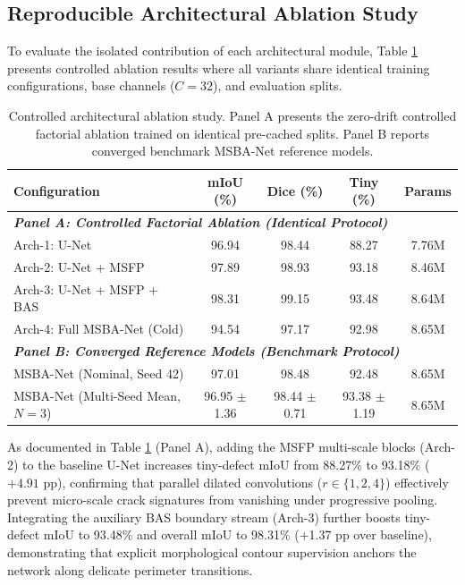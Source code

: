 \documentclass{ieeeaccess}
\begin{document}
\subsection{Reproducible Architectural Ablation Study}
To evaluate the isolated contribution of each architectural module, Table \ref{tab:ablation} presents controlled ablation results where all variants share identical training configurations, base channels ($C=32$), and evaluation splits.

\begin{table}[!t]
\centering
\setlength{\tabcolsep}{1.8pt}
\fontsize{6.8pt}{8.8pt}\selectfont
\caption{Controlled architectural ablation study. Panel A presents the zero-drift controlled factorial ablation trained on identical pre-cached splits. Panel B reports converged benchmark MSBA-Net reference models.}
\label{tab:ablation}
\begin{tabular*}{\columnwidth}{@{\extracolsep{\fill}}lcccc@{}}
\toprule
\textbf{Configuration} & \textbf{mIoU (\%)} & \textbf{Dice (\%)} & \textbf{Tiny (\%)} & \textbf{Params} \\
\midrule
\multicolumn{5}{l}{\textit{\textbf{Panel A: Controlled Factorial Ablation (Identical Protocol)}}} \\
Arch-1: U-Net \cite{ronneberger2015unet} & 96.94 & 98.44 & 88.27 & 7.76M \\
Arch-2: U-Net + MSFP & 97.89 & 98.93 & 93.18 & 8.46M \\
Arch-3: U-Net + MSFP + BAS & 98.31 & 99.15 & 93.48 & 8.64M \\
Arch-4: Full MSBA-Net (Cold) & 94.54 & 97.17 & 92.98 & 8.65M \\
\midrule
\multicolumn{5}{l}{\textit{\textbf{Panel B: Converged Reference Models (Benchmark Protocol)}}} \\
MSBA-Net (Nominal, Seed 42) & 97.01 & 98.48 & 92.48 & 8.65M \\
MSBA-Net (Multi-Seed Mean, $N=3$) & 96.95 $\pm$ 1.36 & 98.44 $\pm$ 0.71 & 93.38 $\pm$ 1.19 & 8.65M \\
\bottomrule
\end{tabular*}
\end{table}

As documented in Table \ref{tab:ablation} (Panel A), adding the MSFP multi-scale blocks (Arch-2) to the baseline U-Net increases tiny-defect mIoU from 88.27\% to 93.18\% ($+4.91\text{ pp}$), confirming that parallel dilated convolutions ($r \in \{1, 2, 4\}$) effectively prevent micro-scale crack signatures from vanishing under progressive pooling. Integrating the auxiliary BAS boundary stream (Arch-3) further boosts tiny-defect mIoU to 93.48\% and overall mIoU to 98.31\% (+1.37 pp over baseline), demonstrating that explicit morphological contour supervision anchors the network along delicate perimeter transitions. 
\end{document}
